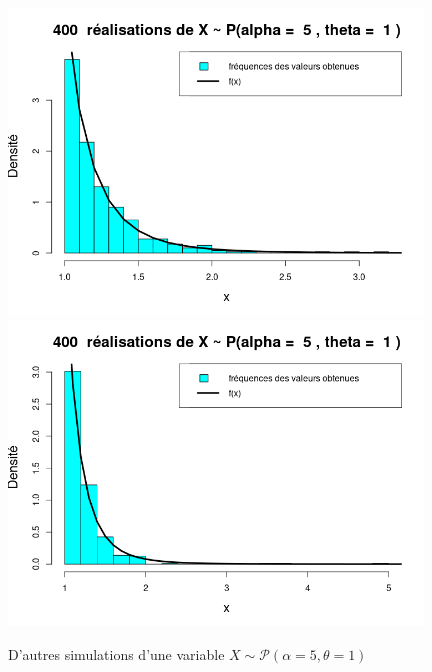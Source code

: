 \documentclass{article}
\begin{document}
\begin{figure}[!ht]
\begin{center}
\includegraphics[width=11cm]{plot_hist_1_a5}
\includegraphics[width=11cm]{plot_hist_2_a5}
\caption{D'autres simulations d'une variable $X \sim \mathcal{P}(\alpha=5,\theta=1)$}
\end{center}
\end{figure}

\clearpage
\end{document}
